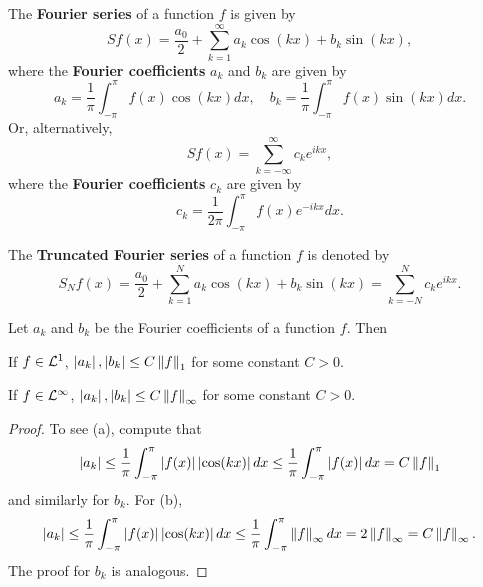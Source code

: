 \begin{definition}
    The \textbf{Fourier series} of a function $f$ is given by 
    \begin{equation*}
        Sf(x) = \frac{a_0}{2} + \sum_{k=1}^\infty a_k \cos(kx) + b_k \sin(kx),
    \end{equation*}
    where the \textbf{Fourier coefficients} $a_k$ and $b_k$ are 
    given by 
    \begin{equation*}
        a_k = \frac{1}{\pi} \int_{-\pi}^\pi f(x) \cos(kx)dx, \quad
        b_k = \frac{1}{\pi} \int_{-\pi}^\pi f(x) \sin(kx)dx.
    \end{equation*}
    Or, alternatively, 
    \begin{equation*}
        Sf(x) = \sum_{k=-\infty}^\infty c_k e^{ikx},
    \end{equation*}
    where the \textbf{Fourier coefficients} $c_k$ are given by
    \begin{equation*}
        c_k = \frac{1}{2\pi} \int_{-\pi}^\pi f(x) e^{-ikx}dx.
    \end{equation*}
\end{definition}

\begin{definition}
    The \textbf{Truncated Fourier series} of a function $f$ is denoted by 
    \begin{equation*}
        S_N f(x) = \frac{a_0}{2} + \sum_{k=1}^N a_k \cos(kx) + b_k \sin(kx) = \sum_{k=-N}^N c_k e^{ikx}.
    \end{equation*}
\end{definition}

\begin{proposition}
    Let $a_k$ and $b_k$ be the Fourier coefficients of a function $f$. Then 
    \begin{thmenum}
        \item If $f\in\mathcal{L}^1$, $\left\lvert {a_k} \right\rvert, \left\lvert {b_k} \right\rvert\leq C\left\lVert {f} \right\rVert_1$ for some constant $C>0$.
        \item If $f\in\mathcal{L}^\infty$, $\left\lvert {a_k} \right\rvert, \left\lvert {b_k} \right\rvert\leq C\left\lVert {f} \right\rVert_\infty$ for some constant $C>0$.
    \end{thmenum}
\end{proposition}
\begin{proof}
    To see (a), compute that
    \begin{equation*}
        \left\lvert {a_k} \right\rvert \leq \frac{1}{\pi}\int_{-\pi}^\pi \left\lvert {f(x)} \right\rvert\left\lvert {\cos(kx)} \right\rvert dx \leq \frac{1}{\pi}\int_{-\pi}^\pi \left\lvert {f(x)} \right\rvert dx = C\left\lVert {f} \right\rVert_1
    \end{equation*}
    and similarly for $b_k$. 
    For (b), 
    \begin{equation*}
        \left\lvert {a_k} \right\rvert \leq \frac{1}{\pi}\int_{-\pi}^\pi \left\lvert {f(x)} \right\rvert\left\lvert {\cos(kx)} \right\rvert dx \leq \frac{1}{\pi}\int_{-\pi}^\pi \left\lVert {f} \right\rVert_\infty dx = 2\left\lVert {f} \right\rVert_\infty = C\left\lVert {f} \right\rVert_\infty.
    \end{equation*}
    The proof for $b_k$ is analogous.
\end{proof}

